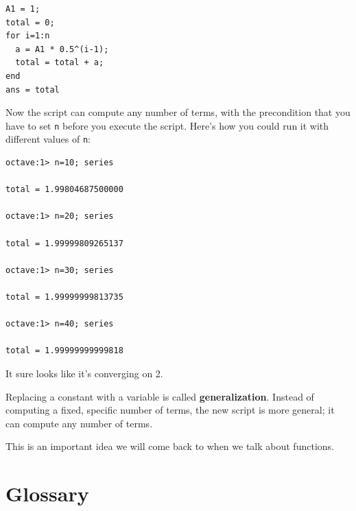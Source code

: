 \documentclass{book}
\begin{document}
\begin{verbatim}
A1 = 1;
total = 0;
for i=1:n
  a = A1 * 0.5^(i-1);
  total = total + a;
end
ans = total
\end{verbatim}

Now the script can compute any number of terms, with the
precondition that you have to set {\tt n} before you execute
the script. Here's how you could run it with different values
of {\tt n}:

\begin{verbatim}
octave:1> n=10; series

total = 1.99804687500000

octave:1> n=20; series

total = 1.99999809265137

octave:1> n=30; series

total = 1.99999999813735

octave:1> n=40; series

total = 1.99999999999818
\end{verbatim}

It sure looks like it's converging on 2.

Replacing a constant with a variable is called {\bf generalization}.
Instead of computing a fixed, specific number of terms, the new script
is more general; it can compute any number of terms.

This is an important idea we will come back to when we
talk about functions.


\section{Glossary}
\end{document}
